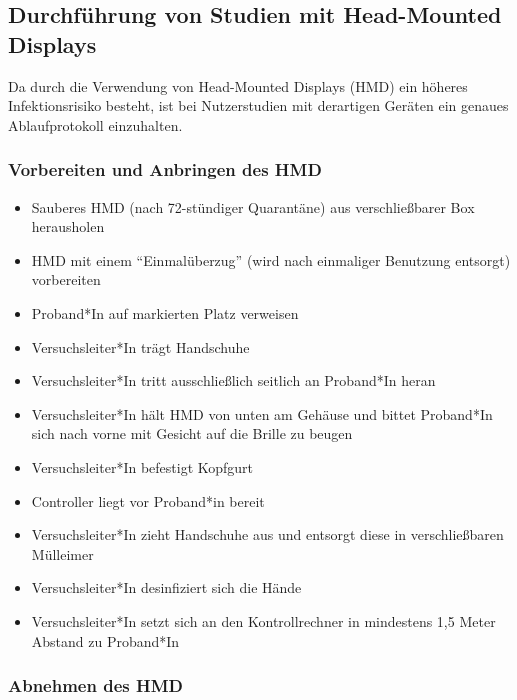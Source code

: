 \subsection{Durchführung von Studien mit Head-Mounted Displays}\label{subsec:nutzerstudien_hmd}

Da durch die Verwendung von Head-Mounted Displays (HMD) ein höheres Infektionsrisiko besteht, ist bei Nutzerstudien mit derartigen Geräten ein genaues Ablaufprotokoll einzuhalten.

\subsubsection*{Vorbereiten und Anbringen des HMD}

{
\singlespacing
\begin{itemize}
    \item Sauberes HMD (nach 72-stündiger Quarantäne) aus verschließbarer Box herausholen
    \item HMD mit einem “Einmalüberzug” (wird nach einmaliger Benutzung entsorgt) vorbereiten
    \item Proband*In auf markierten Platz verweisen 
    \item Versuchsleiter*In trägt Handschuhe
    \item Versuchsleiter*In tritt ausschließlich seitlich an Proband*In heran
    \item Versuchsleiter*In hält HMD von unten am Gehäuse und bittet Proband*In sich nach vorne mit Gesicht auf die Brille zu beugen 
    \item Versuchsleiter*In befestigt Kopfgurt 
    \item Controller liegt vor Proband*in bereit 
    \item Versuchsleiter*In zieht Handschuhe aus und entsorgt diese in verschließbaren Mülleimer
    \item Versuchsleiter*In desinfiziert sich die Hände
    \item Versuchsleiter*In setzt sich an den Kontrollrechner in mindestens 1,5 Meter Abstand zu Proband*In
\end{itemize}
}

\subsubsection*{Abnehmen des HMD}

